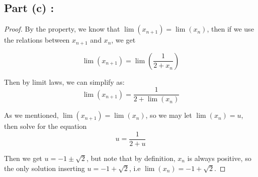 \documentclass[12pt]{article}
\begin{document}
\subsection*{Part (c) :}
\begin{proof}
By the property, we know that $\lim(x_{n+1}) = \lim(x_n)$,
then if we use the relations between $x_{n+1}$ and $x_n$, 
we get 

\[ \lim(x_{n+1}) = \lim(\frac{1}{2+x_n})\]

Then by limit laws, we can simplify as:
\[ \lim(x_{n+1}) = \frac{1}{2 + \lim(x_n)} \]

As we mentioned, $\lim(x_{n+1}) = \lim(x_n)$, so we may
let $\lim(x_n) = u$, then solve for the equation
\[ u = \frac{1}{2+u} \]

Then we get $u = -1 \pm \sqrt{2}$, but note that by definition,
$x_n$ is always positive, so the only solution inserting
$u = -1 + \sqrt{2}$, i.e $\lim(x_n) = -1 + \sqrt{2}$.
\end{proof}
\end{document}

